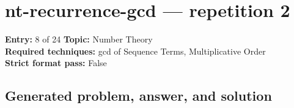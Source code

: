 \documentclass[11pt]{article}
\begin{document}
\section{nt-recurrence-gcd --- repetition 2}
\begin{minipage}{\textwidth}
\color{metadata}\small\raggedright
\textbf{Entry:} 8 of 24\quad
\textbf{Topic:} Number Theory\\[2pt]
\textbf{Required techniques:} gcd of Sequence Terms, Multiplicative Order\\[2pt]
\textbf{Strict format pass:} False
\end{minipage}

\subsection*{Generated problem, answer, and solution}
\end{document}
